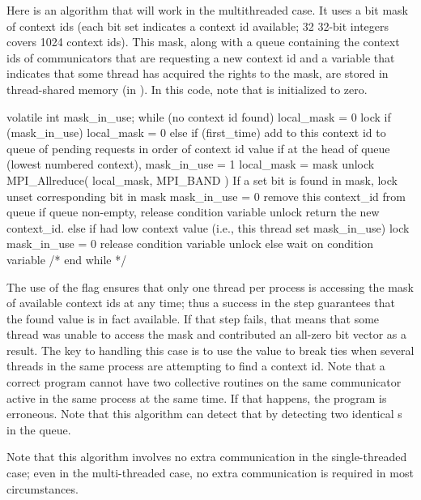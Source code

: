 \documentclass{article}
\begin{document}
Here is an algorithm that will work in the multithreaded case.  It
uses a bit mask of context ids (each bit set indicates a context id
available; 32 32-bit integers covers 1024 context ids).  This mask,
along with a queue containing the context ids of communicators that
are requesting a new context id and a variable that indicates that
some thread has acquired the rights to the mask, are stored in
thread-shared memory (in ).
In this code, note that  is initialized to zero.

\begin{algorithm}
volatile int mask_in_use;
while (no context id found) {
    local_mask = 0
    lock 
    if (mask_in_use) local_mask = 0
    else if (first_time) 
        add to this context id to queue of pending
        requests in order of context id value
    if at the head of queue (lowest numbered context), 
        mask_in_use = 1
        local_mask = mask
    unlock
    MPI_Allreduce( local_mask, MPI_BAND )
    If a set bit is found in mask,
        lock
        unset corresponding bit in mask
        mask_in_use = 0
        remove this context_id from queue
        if queue non-empty, release condition variable
        unlock
        return the new context_id.
    else if had low context value (i.e., this thread set mask_in_use)
        lock
        mask_in_use = 0
        release condition variable
        unlock
    else
        wait on condition variable
    } /* end while */
\end{algorithm}
The use of the flag  ensures that only one thread per process
is accessing the mask of available context ids at any time; thus a
success in the  step guarantees that the found
value is in fact available.  If that step fails, that means that some
thread was unable to access the mask and contributed an all-zero bit
vector as a result.  
The key to handling this case is to use the
 value to break ties when several threads
in the same process are attempting to find a context id.  Note that a
correct program cannot have two collective routines on the same
communicator active in the same process at the same time.  If that
happens, the program is erroneous.  Note that this algorithm can
detect that by detecting two identical s in the
queue.

Note that this algorithm involves no extra communication in the
single-threaded case; even in the multi-threaded case, no extra
communication is required in most circumstances.
\end{document}
